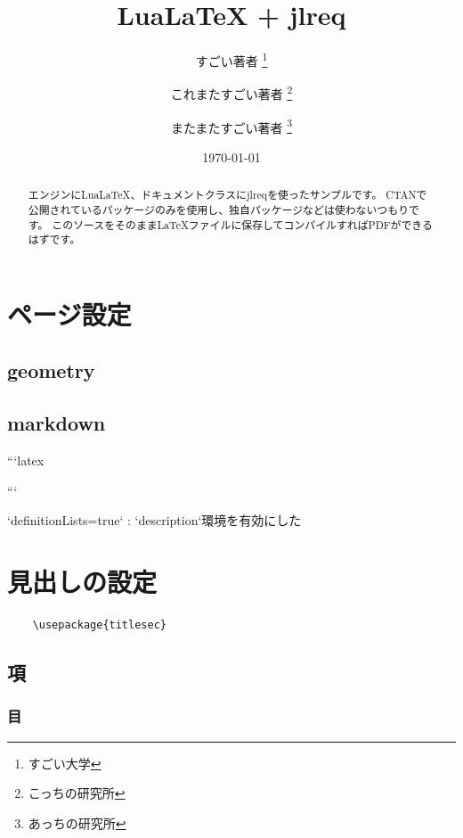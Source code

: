 \documentclass[article, head_space=25truemm, foot_space=15truemm, gutter=15truemm]{jlreq}
\title{LuaLaTeX + jlreq}
\author{
    すごい著者 \thanks{すごい大学} \\ \and
    これまたすごい著者 \thanks{こっちの研究所} \\ \and
    またまたすごい著者 \thanks{あっちの研究所}
}
\date{\today}
\begin{document}
\maketitle

\begin{abstract}
エンジンにLuaLaTeX、ドキュメントクラスにjlreqを使ったサンプルです。
CTANで公開されているパッケージのみを使用し、独自パッケージなどは使わないつもりです。
このソースをそのままLaTeXファイルに保存してコンパイルすればPDFができるはずです。
\end{abstract}

\tableofcontents

\section{ページ設定}

\subsection{geometry}

\subsection{markdown}

\begin{markdown}
```latex
\usepackage[
    definitionLists=true,
    ]{markdown}
```
\end{markdown}

\begin{markdown}
`definitionLists=true`
: `description`環境を有効にした
\end{markdown}

\section{見出しの設定}

\begin{verbatim}
    \usepackage{titlesec}
\end{verbatim}


\subsection{項}


\subsubsection{目}
\end{document}

